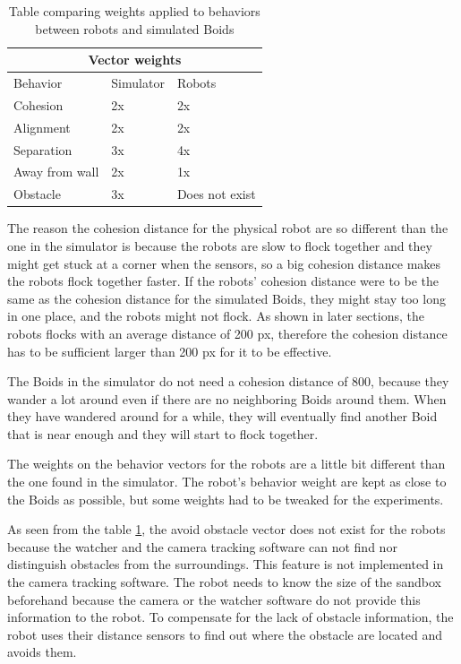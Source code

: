 \begin{table}[h]
\begin{center}

\begin{tabular}{|l|l|l|}
\hline
\multicolumn{3}{|c|}{Vector weights} \\ \hline
Behavior        & Simulator & Robots \\ \hline
Cohesion        & 2x        & 2x     \\ \hline
Alignment       & 2x        & 2x     \\ \hline
Separation      & 3x        & 4x     \\ \hline
Away from wall  & 2x        & 1x     \\ \hline
Obstacle        & 3x        & Does not exist   \\ \hline
\end{tabular}
\end{center}
\caption[Weights comparison]{Table comparing weights applied to behaviors between robots and simulated Boids}
\label{tab:weights}
\end{table}

The reason the cohesion distance for the physical robot are so different than the one in the simulator is because the robots are slow to flock together and they might get stuck at a corner when the sensors, so a big cohesion distance makes the robots flock together faster. If the robots' cohesion distance were to be the same as the cohesion distance for the simulated Boids, they might stay too long in one place, and the robots might not flock. As shown in later sections, the robots flocks with an average distance of 200 px, therefore the cohesion distance has to be sufficient larger than 200 px for it to be effective. 

The Boids in the simulator do not need a cohesion distance of 800, because they wander a lot around even if there are no neighboring Boids around them. When they have wandered around for a while, they will eventually find another Boid that is near enough and they will start to flock together.

The weights on the behavior vectors for the robots are a little bit different than the one found in the simulator. The robot's behavior weight are kept as close to the Boids as possible, but some weights had to be tweaked for the experiments.

As seen from the table \ref{tab:weights}, the avoid obstacle vector does not exist for the robots because the watcher and the camera tracking software can not find nor distinguish obstacles from the surroundings. This feature is not implemented in the camera tracking software. The robot needs to know the size of the sandbox beforehand because the camera or the watcher software do not provide this information to the robot. To compensate for the lack of obstacle information, the robot uses their distance sensors to find out where the obstacle are located and avoids them.

